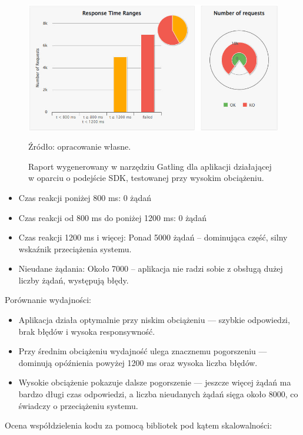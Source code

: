 \documentclass[runningheads,12pt]{llncs}
\begin{document}
\begin{figure}
    \centering
    \includegraphics[width=0.8\linewidth]{images/sdk-gatling-high-graph.jpg}
    \caption{Raport wygenerowany w narzędziu Gatling dla aplikacji działającej w oparciu o podejście SDK, testowanej przy wysokim obciążeniu.}
    \label{fig:high}
    \vspace{0.5em}
    {\small Źródło: opracowanie własne.}
\end{figure}

\begin{itemize}
    \item Czas reakcji poniżej 800 ms: 0 żądań
    \item Czas reakcji od 800 ms do poniżej 1200 ms:  0 żądań
    \item Czas reakcji 1200 ms i więcej: Ponad 5000 żądań – dominująca część, silny wskaźnik przeciążenia systemu.
    \item Nieudane żądania: Około 7000 – aplikacja nie radzi sobie z obsługą dużej liczby żądań, występują błędy.
\end{itemize}

Porównanie wydajności: 

\begin{itemize}
    \item Aplikacja działa optymalnie przy niskim obciążeniu — szybkie odpowiedzi, brak błędów i wysoka responsywność.
    \item Przy średnim obciążeniu wydajność ulega znacznemu pogorszeniu — dominują opóźnienia powyżej 1200 ms oraz wysoka liczba błędów.
    \item Wysokie obciążenie pokazuje dalsze pogorszenie — jeszcze więcej żądań ma bardzo długi czas odpowiedzi, a liczba nieudanych żądań sięga około 8000, co świadczy o przeciążeniu systemu.
\end{itemize}

\newpage


Ocena współdzielenia kodu za pomocą bibliotek pod kątem skalowalności:
\end{document}
